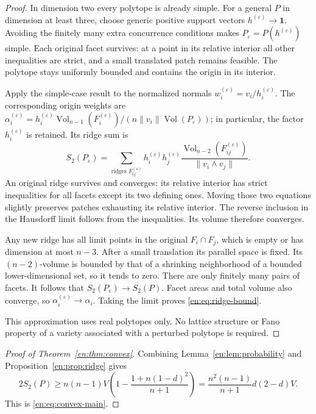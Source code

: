 \documentclass[12pt]{amsart}
\theoremstyle{definition}
\theoremstyle{remark}
\numberwithin{equation}{section}
\theoremstyle{plain}
\theoremstyle{definition}
\theoremstyle{remark}
\begin{document}
\begin{proof}
In dimension two every polytope is already simple. For a general $P$ in dimension at least three, choose generic positive support vectors
$h^{(\varepsilon)}\to\mathbf1$. Avoiding the finitely many extra concurrence conditions makes $P_\varepsilon=P(h^{(\varepsilon)})$ simple. Each original facet survives: at a point in its relative interior all other inequalities are strict, and a small translated patch remains feasible. The polytope stays uniformly bounded and contains the origin in its interior.

Apply the simple-case result to the normalized normals
$w_i^{(\varepsilon)}=v_i/h_i^{(\varepsilon)}$.
The corresponding origin weights are
$\alpha_i^{(\varepsilon)}
=h_i^{(\varepsilon)}\operatorname{Vol}_{n-1}(F_i^{(\varepsilon)})
 /(n\|v_i\|\operatorname{Vol}(P_\varepsilon))$; in particular, the factor
$h_i^{(\varepsilon)}$ is retained. Its ridge sum is
\begin{equation}\label{en:eq:perturbed-ridge}
 S_2(P_\varepsilon)=
 \sum_{\text{ridges }F_{ij}^{(\varepsilon)}}
 h_i^{(\varepsilon)}h_j^{(\varepsilon)}
 \frac{\operatorname{Vol}_{n-2}(F_{ij}^{(\varepsilon)})}
 {\|v_i\wedge v_j\|}.
\end{equation}
An original ridge survives and converges: its relative interior has strict inequalities for all facets except its two defining ones. Moving those two equations slightly preserves patches exhausting its relative interior. The reverse inclusion in the Hausdorff limit follows from the inequalities. Its volume therefore converges.

Any new ridge has all limit points in the original $F_i\cap F_j$, which is empty or has dimension at most $n-3$. After a small translation its parallel space is fixed. Its $(n-2)$-volume is bounded by that of a shrinking neighborhood of a bounded lower-dimensional set, so it tends to zero. There are only finitely many pairs of facets. It follows that $S_2(P_\varepsilon)\to S_2(P)$. Facet areas and total volume also converge, so $\alpha_i^{(\varepsilon)}\to\alpha_i$. Taking the limit proves \eqref{en:eq:ridge-bound}.

This approximation uses real polytopes only. No lattice structure or Fano property of a variety associated with a perturbed polytope is required.
\end{proof}

\begin{proof}[Proof of Theorem~\ref{en:thm:convex}]
Combining Lemma~\ref{en:lem:probability} and Proposition~\ref{en:prop:ridge} gives
\[
 2S_2(P)\ge n(n-1)V
 \left(1-\frac{1+n(1-d)^2}{n+1}\right)
 =\frac{n^2(n-1)}{n+1}d(2-d)V.
\]
This is \eqref{en:eq:convex-main}.
\end{proof}
\end{document}
